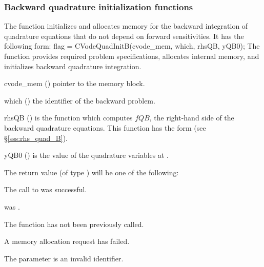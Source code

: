 \subsubsection{Backward quadrature initialization functions}
\label{sss:cvquadinitb}

The function  initializes and allocates memory for the backward
integration of quadrature equations that do not depend on forward sensitivities.
It has the following form:
{
flag = CVodeQuadInitB(cvode\_mem, which, rhsQB, yQB0);
}
{
  The function  provides required problem specifications,
  allocates internal memory, and initializes backward quadrature integration.
}
{
  \begin{args}
  \item[cvode\_mem] ()
    pointer to the {\cvodes} memory block.
  \item[which] ()
    the identifier of the backward problem.
  \item[rhsQB] ()
    is the {\CC} function which computes $fQB$, the right-hand side of the
    backward quadrature equations. This function has the form
    (see \S\ref{sss:rhs_quad_B}).
  \item[yQB0] ()
    is the value of the quadrature variables at .
  \end{args}
}
{
  The return value  (of type ) will be one of the following:
  \begin{args}
  \item[\Id{CV\_SUCCESS}]
    The call to  was successful.
  \item[\Id{CV\_MEM\_NULL}]
     was .
  \item[\Id{CV\_NO\_ADJ}]
    The function  has not been previously called.
  \item[\Id{CV\_MEM\_FAIL}]
    A memory allocation request has failed.
  \item[\Id{CV\_ILL\_INPUT}]
    The parameter  is an invalid identifier.
  \end{args}
}
{}

